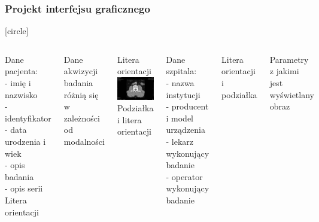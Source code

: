 \documentclass[aspectratio=169]{beamer}
\begin{document}
\begin{frame}
    \frametitle{Projekt interfejsu graficznego}
    [circle]
    \tiny
    \begin{columns}[t]


        Dane pacjenta:\\
        - imię i nazwisko\\
        - identyfikator\\
        - data urodzenia i wiek\\
        - opis badania\\
        - opis serii\\

        \vspace{8em}
        Litera orientacji

        \vspace{10em}
        Dane akwizycji badania\\
        różnią się w zależności od modalności


        \centering
        Litera orientacji
        \includegraphics[width=\textwidth]{img/sokar-gui-003.png}
        Podziałka i litera orientacji


        Dane szpitala:\\
        - nazwa instytucji\\
        - producent i model urządzenia\\
        - lekarz wykonujący badanie\\
        - operator wykonujący badanie

        \vspace{5em}
        Litera orientacji i podziałka

        \vspace{11em}
        Parametry z jakimi jest wyświetlany obraz

    \end{columns}
\end{frame}
\end{document}
